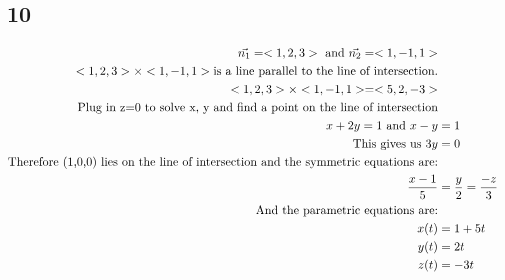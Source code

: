 \documentclass{article}%
\begin{document}
\subsection*{10}%
\begin{alignat*}{2}%
\vec{n_1} = <1,2,3> \textnormal{ and } \vec{n_2} = <1,-1,1>\\%
<1,2,3> \times <1,-1,1> \textnormal{is a line parallel to the line of intersection.}\\%
<1,2,3> \times <1,-1,1> = <5,2,-3>\\%
\textnormal{Plug in z=0 to solve x, y and find a point on the line of intersection}\\%
x+2y=1 \textnormal{ and } x-y &=1\\%
\textnormal{This gives us } 3y &= 0 \\%
\textnormal{Therefore (1,0,0) lies on the line of intersection and the symmetric equations are:}\\%
\frac{x-1}{5} &= \frac{y}{2} = \frac{-z}{3}\\%
\textnormal{And the parametric equations are:}\\%
x(t) &= 1+5t\\%
y(t) &= 2t\\%
z(t) &= -3t\\%
\end{alignat*}

%
\end{document}
